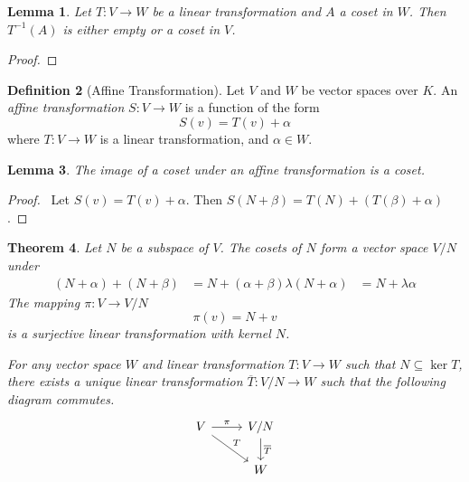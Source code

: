 \documentclass{book}
\let\qed\relax
\newtheorem{lm}{Lemma}[chapter]
\newtheorem{thm}[lm]{Theorem}
\theoremstyle{definition}
\newtheorem{df}[lm]{Definition}
\newcommand{\inv}[1]{\ensuremath{{#1}^{-1}}}
\begin{document}
  \begin{lm}
    Let $T : V \rightarrow W$ be a linear transformation and $A$ a coset in 
    $W$. 
    Then $\inv{T}(A)$ is either empty or a coset in $V$.
  \end{lm}
  
  \begin{proof}
    \pf
    \step{1}{\pflet{$\alpha \in \inv{T}(A)$}}
    \step{3}{$\inv{T}(A) = \inv{T}(N) + \alpha$}
    \qed
  \end{proof}
  
  \begin{df}[Affine Transformation]
    Let $V$ and $W$ be vector spaces over $K$. An \emph{affine transformation} 
    $S 
    : V \rightarrow W$ is a function of the form
    \[ S(v) = T(v) + \alpha \]
    where $T : V \rightarrow W$ is a linear transformation, and $\alpha \in W$.
  \end{df}
  
  \begin{lm}
    The image of a coset under an affine transformation is a coset.
  \end{lm}
  
  \begin{proof}
    \pf\ Let $S(v) = T(v) + \alpha$. Then $S(N + \beta) = T(N) + (T(\beta) + 
    \alpha)$. \qed
  \end{proof}
  
  \begin{thm}
    Let $N$ be a subspace of $V$. The cosets of $N$ form a vector space $V / N$ 
    under 
    \begin{align*}
      (N + \alpha) + (N + \beta) & = N + (\alpha + \beta)
      \lambda (N + \alpha) & = N + \lambda \alpha
    \end{align*}
    The mapping $\pi : V \rightarrow V / N$
    \[ \pi(v) = N + v \]
    is a surjective linear transformation with kernel $N$.
    
    For any vector space $W$ and linear transformation $T : V \rightarrow W$ 
    such 
    that $N \subseteq \ker T$, there exists a unique linear transformation 
    $\overline{T} : V / N \rightarrow W$ such that the following diagram 
    commutes.
    \[ \begin{tikzcd}
      V \ar[r, "\pi"] \ar[dr, "T"] & V / N \ar[d, "\overline{T}"] \\
      & W
    \end{tikzcd} \]
  \end{thm}
  
\end{document}
